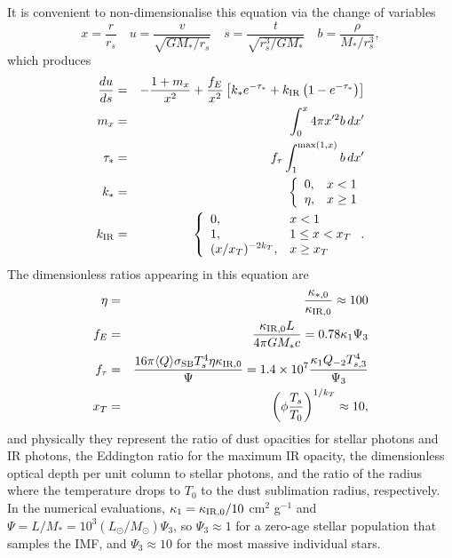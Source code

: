 \documentclass[useAMS,usenatbib]{mn2e}
\begin{document}
It is convenient to non-dimensionalise this equation via the change of variables
\begin{equation}
x = \frac{r}{r_s} \quad u = \frac{v}{\sqrt{G M_* / r_s}}
\quad s = \frac{t}{\sqrt{r_s^3/G M_*}}
\quad b = \frac{\rho}{M_*/r_s^3},
\end{equation}
which produces
\begin{eqnarray}
\frac{du}{ds} & = & -\frac{1+m_x}{x^2} + \frac{f_E}{x^2} \left[k_* e^{-\tau_*} + k_{\rm IR}\left(1-e^{-\tau_*}\right)\right]
\label{eq:eom}
\\
m_x & = & \int_0^x 4\pi x'^2 b \, dx' \\
\tau_* & = & f_\tau \int_1^{\max(1,x)} b \, dx' \\
k_* & = & 
\left\{
\begin{array}{ll}
0, & x < 1 \\
\eta, & x \geq 1
\end{array}
\right.
\\
k_{\rm IR} & = &
\left\{
\begin{array}{ll}
0, & x < 1 \\
1, & 1 \leq x < x_T \\
(x/x_T)^{-2k_T}, & x \geq x_T
\end{array}
\right..
\end{eqnarray}
The dimensionless ratios appearing in this equation are
\begin{eqnarray}
\eta & = & \frac{\kappa_{*,0}}{\kappa_{\rm IR,0}} \approx 100 \\
f_E & = & \frac{\kappa_{\rm IR,0} L}{4\pi G M_* c} = 0.78 \kappa_1 \Psi_3 \\
f_\tau & = & \frac{16\pi \langle Q\rangle \sigma_{\rm SB} T_s^4 \eta \kappa_{\rm IR,0}}{\Psi}
= 1.4\times 10^7 \frac{\kappa_1 Q_{-2} T_{s,3}^4}{\Psi_3} \\
x_T & = & \left(\phi\frac{T_s}{T_0}\right)^{1/k_T} \approx 10,
\end{eqnarray}
and physically they represent the ratio of dust opacities for stellar photons and IR photons, the Eddington ratio for the maximum IR opacity, the dimensionless optical depth per unit column to stellar photons, and the ratio of the radius where the temperature drops to $T_0$ to the dust sublimation radius, respectively. In the numerical evaluations, $\kappa_1 = \kappa_{\rm IR,0}/10$ cm$^2$ g$^{-1}$ and $\Psi = L/M_* = 10^3 (L_\odot/M_\odot) \Psi_3$, so $\Psi_3 \approx 1$ for a zero-age stellar population that samples the IMF, and $\Psi_3 \approx 10$ for the most massive individual stars.
\end{document}
